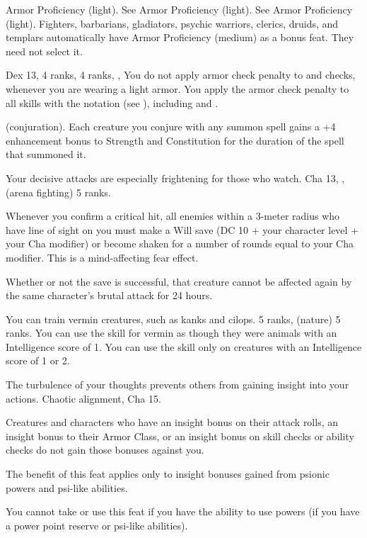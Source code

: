 {}
{Armor Proficiency (light).}
{See Armor Proficiency (light).}
{See Armor Proficiency (light).}
{Fighters, barbarians, gladiators, psychic warriors, clerics, druids, and templars automatically have Armor Proficiency (medium) as a bonus feat. They need not select it.}

{}
{Dex 13,  4 ranks,  4 ranks, , }
{You do not apply armor check penalty to  and  checks, whenever you are wearing a light armor.}
{You apply the armor check penalty to all skills with the notation (see ), including  and .}
{}

{ (conjuration).}
{Each creature you conjure with any summon spell gains a +4 enhancement bonus to Strength and Constitution for the duration of the spell that summoned it.}

{Your decisive attacks are especially frightening for those who watch.}
{Cha 13, ,  (arena fighting) 5 ranks.}
{Whenever you confirm a critical hit, all enemies within a 3-meter radius who have line of sight on you must make a Will save (DC 10 + \onehalf your character level + your Cha modifier) or become shaken for a number of rounds equal to your Cha modifier. This is a mind-affecting fear effect.

Whether or not the save is successful, that creature cannot be affected again by the same character's brutal attack for 24 hours.}{}{}

{You can train vermin creatures, such as kanks and cilops.}
{ 5 ranks,  (nature) 5 ranks.}
{You can use the  skill for vermin as though they were animals with an Intelligence score of 1.}
{You can use the  skill only on creatures with an Intelligence score of 1 or 2.}
{}

{The turbulence of your thoughts prevents others from gaining insight into your actions.}
{Chaotic alignment, Cha 15.}
{Creatures and characters who have an insight bonus on their attack rolls, an insight bonus to their Armor Class, or an insight bonus on skill checks or ability checks do not gain those bonuses against you.

The benefit of this feat applies only to insight bonuses gained from psionic powers and psi-like abilities. %
}{}
{You cannot take or use this feat if you have the ability to use powers (if you have a power point reserve or psi-like abilities).}

